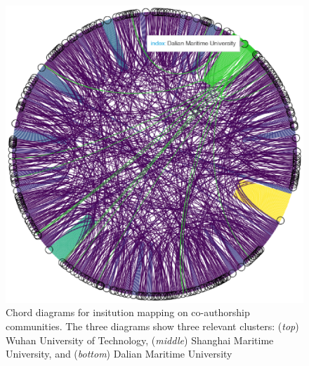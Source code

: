 \documentclass[a4paper, review, endfloat, doubleblind, authoryear]{elsarticle}
\begin{document}
\begin{figure}[htbp]
		\includegraphics[height=0.3\textheight, keepaspectratio]{pics/coauthorship_inst_chord_3.eps}
		\caption{Chord diagrams for insitution mapping on co-authorship communities. The three diagrams show three relevant clusters: (\textit{top}) Wuhan University of Technology, (\textit{middle}) Shanghai Maritime University, and (\textit{bottom}) Dalian Maritime University}\label{fig:fig6}
	\end{figure}
\end{document}
